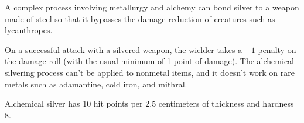 A complex process involving metallurgy and alchemy can bond silver to a weapon made of steel so that it bypasses the damage reduction of creatures such as lycanthropes.

On a successful attack with a silvered weapon, the wielder takes a $-1$ penalty on the damage roll (with the usual minimum of 1 point of damage). The alchemical silvering process can't be applied to nonmetal items, and it doesn't work on rare metals such as adamantine, cold iron, and mithral.

Alchemical silver has 10 hit points per 2.5 centimeters of thickness and hardness 8.
